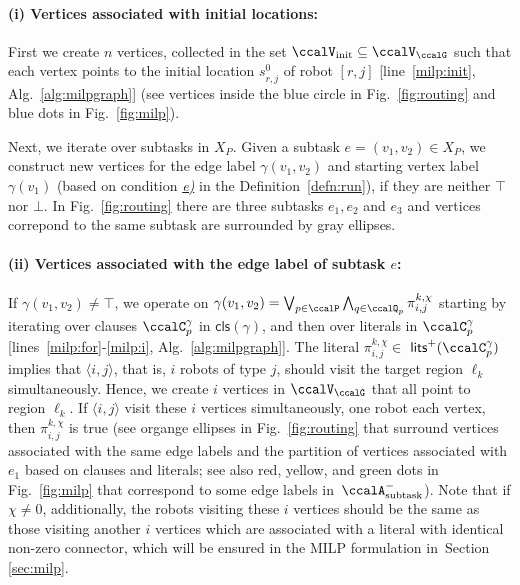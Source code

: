 \documentclass[Afour,sageh,times]{sagej}
\newcommand{\clause}[1]{\mathsf{cls}(#1)}
\newcommand{\auto}[1]{\ccalA_{\textup{#1}}}
\newcommand{\ag}[2]{\langle#1,#2\rangle}
\renewcommand{\ap}[3]{\mathcal{\pi}_{{#1},{#2}}^{#3}}
\begin{document}
\paragraph{(i) Vertices associated with initial locations:} First we create $n$ vertices, collected in the set $\ccalV_{\text{init}}\subseteq \ccalV_{\ccalG}$ such that each vertex points to the initial location $s^0_{r,j}$ of robot $[r,j]$ [line~\ref{milp:init}, Alg.~\ref{alg:milpgraph}] (see vertices inside the blue circle in Fig.~\ref{fig:routing} and blue dots in Fig.~\ref{fig:milp}).

Next, we iterate over subtasks in $X_{P}$. Given a subtask $e = (v_1, v_2) \in X_{P}$, we construct new vertices for the  edge label $\gamma(v_1, v_2)$ and starting vertex label $\gamma(v_1)$ (based on condition \hyperref[cond:e]{\it e)} in the Definition~\ref{defn:run}), if they are neither $\top$ nor $\bot$. In Fig.~\ref{fig:routing} there are three subtasks $e_1, e_2$ and $e_3$  and vertices correpond to the same subtask are surrounded by gray ellipses.

\paragraph{(ii) Vertices associated with the edge label of subtask $e$:} If $\gamma(v_1, v_2) \not= \top$, we operate on $\gamma(v_1, v_2) =  \bigvee_{p\in \ccalP} \bigwedge_{q \in \ccalQ_{p}} \ap{i}{j}{k,\chi}$ starting by iterating over clauses $\ccalC_p^{\gamma}$ in $\clause{\gamma}$, and then over literals in $\ccalC_p^\gamma$ [lines~\ref{milp:for}-\ref{milp:i}, Alg.~\ref{alg:milpgraph}].
The literal $\ap{i}{j}{k,\chi}\in $ $\mathsf{lits}^+(\ccalC_p^{\gamma})$ implies that $\ag{i}{j}$, that is, $i$ robots of type $j$,  should visit the target region $\ell_k$ simultaneously. Hence, we create $i$ vertices in $\ccalV_\ccalG$  that all point to region $\ell_k$. If $\ag{i}{j}$ visit these $i$ vertices simultaneously, one robot each vertex, then $\ap{i}{j}{k,\chi}$ is true (see organge ellipses in Fig.~\ref{fig:routing} that surround vertices associated with the same edge labels and the partition of vertices associated with $e_1$ based on clauses and literals; see also red, yellow, and green dots in Fig.~\ref{fig:milp} that correspond to some edge labels in~$\auto{subtask}^-$). Note that if $\chi\not=0$, additionally, the robots visiting these $i$ vertices should be the same as those visiting another $i$ vertices which are associated with a literal with identical non-zero connector, which will be ensured in the MILP formulation in~Section \ref{sec:milp}.
\end{document}
